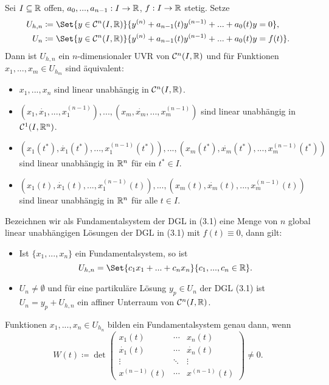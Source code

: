 \documentclass{cheat-sheet}
\begin{document}
\begin{satz}
  Sei $I \subseteq \mathbb{R}$ offen, $a_0, ..., a_{n-1} : I \to \mathbb{R}$, $f : I \to \mathbb{R}$ stetig. Setze
  \begin{align*}
    U_{h,n} &\coloneqq \Set{ y \in \mathcal{C}^n(I, \R) }{ y^{(n)} + a_{n-1}(t) y^{(n-1)} + ... + a_0(t) y = 0 },\\
    U_{n} &\coloneqq \Set{ y \in \mathcal{C}^n(I, \R) }{ y^{(n)} + a_{n-1}(t) y^{(n-1)} + ... + a_0(t) y = f(t) }.
  \end{align*}
  Dann ist $U_{h,n}$ ein $n$-dimensionaler UVR von $\mathcal{C}^n(I, \mathbb{R})$ und für Funktionen $x_1, ..., x_m \in U_{h_m}$ sind äquivalent:
  \begin{itemize}
    \item $x_1, ..., x_n$ sind linear unabhängig in $\mathcal{C}^n(I, \mathbb{R})$.
    \item $(x_1, \dot{x_1}, ..., x_1^{(n-1)}), ..., (x_m, \dot{x_m}, ..., x_m^{(n-1)})$ sind linear unabhängig in $\mathcal{C}^1(I, \mathbb{R}^n)$.
    \item $(x_1(t^*), \dot{x_1}(t^*), ..., x_1^{(n-1)}(t^*)), ..., (x_m(t^*), \dot{x_m}(t^*), ..., x_m^{(n-1)}(t^*))$ sind linear unabhängig in $\mathbb{R}^n$ für ein $t^* \in I$.
    \item $(x_1(t), \dot{x_1}(t), ..., x_1^{(n-1)}(t)), ..., (x_m(t), \dot{x_m}(t), ..., x_m^{(n-1)}(t))$ sind linear unabhängig in $\mathbb{R}^n$ für alle $t \in I$.
  \end{itemize}
  Bezeichnen wir als Fundamentalsystem der DGL in (3.1) eine Menge von $n$ global linear unabhängigen Lösungen der DGL in (3.1) mit $f(t) \equiv 0$, dann gilt:
  \begin{itemize}
    \item Ist $\{ x_1, ..., x_n \}$ ein Fundamentalsystem, so ist
    \[ U_{h,n} = \Set{c_1 x_1 + ... + c_n x_n}{c_1, ..., c_n \in \R}. \]
    \item $U_n \not= \emptyset$ und für eine partikuläre Lösung $y_p \in U_n$ der DGL (3.1) ist $U_n = y_p + U_{h,n}$ ein affiner Unterraum von $\mathcal{C}^n(I, \mathbb{R})$.
  \end{itemize}
\end{satz}

\begin{bem}
  Funktionen $x_1, ..., x_n \in U_{h_n}$ bilden ein Fundamentalsystem genau dann, wenn
  \[
    W(t) \coloneqq \det \begin{pmatrix}
      x_1(t) & \cdots & x_n(t) \\
      \dot{x_1}(t) & \cdots & \dot{x_n}(t) \\
      \vdots & \ddots & \vdots \\
      x^{(n-1)}(t) & \cdots & x^{(n-1)}(t)
    \end{pmatrix} \not= 0.
  \]
\end{bem}
\end{document}
